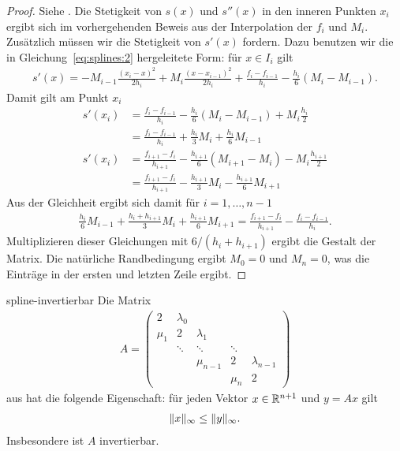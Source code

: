 \begin{proof}
  Siehe \cite[Abschnitt 2.4.2]{Stoer83}. Die Stetigkeit von $s(x)$ und
  $s''(x)$ in den inneren Punkten $x_i$ ergibt sich im vorhergehenden
  Beweis aus der Interpolation der $f_i$ und $M_i$. Zusätzlich müssen
  wir die Stetigkeit von $s'(x)$ fordern. Dazu benutzen wir die in
  Gleichung~\eqref{eq:splines:2} hergeleitete Form: für $x\in I_i$ gilt
  \begin{gather}
    s'(x) = -M_{i-1} \frac{(x_i-x)^2}{2h_i} + M_{i} \frac{(x-x_{i-1})^2}{2h_i}
    + \frac{f_{i}-f_{i-1}}{h_i} - \frac{h_i}{6} (M_i-M_{i-1}).
  \end{gather}
  Damit gilt am Punkt $x_i$
  \begin{align}
    s'(x_i) &= \frac{f_{i}-f_{i-1}}{h_i} - \frac{h_i}{6} (M_i-M_{i-1})
              + M_i \frac{h_i}{2}\\
            &= \frac{f_{i}-f_{i-1}}{h_i} + \frac{h_i}{3}M_i + \frac{h_i}{6}M_{i-1}\\
    s'(x_i) &= \frac{f_{i+1}-f_{i}}{h_{i+1}} - \frac{h_{i+1}}{6} (M_{i+1}-M_{i})
              - M_i \frac{h_{i+1}}{2}\\
    &= \frac{f_{i+1}-f_{i}}{h_{i+1}} - \frac{h_{i+1}}{3}M_i - \frac{h_{i+1}}{6}M_{i+1}
  \end{align}
  Aus der Gleichheit ergibt sich damit für $i=1,\dots,n-1$
  \begin{gather}
    \frac{h_i}{6}M_{i-1} + \frac{h_i+h_{i+1}}{3}M_i + \frac{h_{i+1}}{6}M_{i+1}
    =  \frac{f_{i+1}-f_{i}}{h_{i+1}} - \frac{f_{i}-f_{i-1}}{h_i}.
  \end{gather}
  Multiplizieren dieser Gleichungen mit $6/(h_i+h_{i+1})$ ergibt die
  Gestalt der Matrix.  Die natürliche Randbedingung ergibt $M_0 = 0$
  und $M_n = 0$, was die Einträge in der ersten und letzten Zeile ergibt.
\end{proof}

\begin{Lemma}{spline-invertierbar}
  Die Matrix
  \begin{gather}
    A =  \begin{pmatrix}
      2 & \lambda_0 \\
      \mu_1 & 2 & \lambda_1\\
      & \ddots & \ddots & \ddots \\
      && \mu_{n-1} & 2 & \lambda_{n-1}\\
      &&&\mu_n & 2
    \end{pmatrix}
  \end{gather}
  aus  hat die folgende Eigenschaft:
  für jeden Vektor $x\in \mathbb R^{n+1}$ und $y=Ax$ gilt
  \begin{gather}
    \lVert x\rVert_\infty \le \lVert y\rVert_\infty.
  \end{gather}
  Insbesondere ist $A$ invertierbar.
\end{Lemma}


